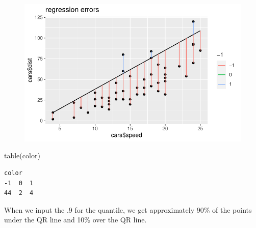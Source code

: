 \documentclass[
  letterpaper,
  DIV=11,
  numbers=noendperiod]{scrreprt}
\newenvironment{Shaded}{\begin{snugshade}}{\end{snugshade}}
\newcommand{\FunctionTok}[1]{\textcolor[rgb]{0.28,0.35,0.67}{#1}}
\newcommand{\NormalTok}[1]{\textcolor[rgb]{0.00,0.23,0.31}{#1}}
\begin{document}
\begin{figure}[H]

{\centering \includegraphics{methods_files/figure-pdf/unnamed-chunk-4-1.pdf}

}

\end{figure}

\begin{Shaded}
\begin{Highlighting}[]
\FunctionTok{table}\NormalTok{(color)}
\end{Highlighting}
\end{Shaded}

\begin{verbatim}
color
-1  0  1 
44  2  4 
\end{verbatim}

When we input the .9 for the quantile, we get approximately 90\% of the
points under the QR line and 10\% over the QR line.
\end{document}
